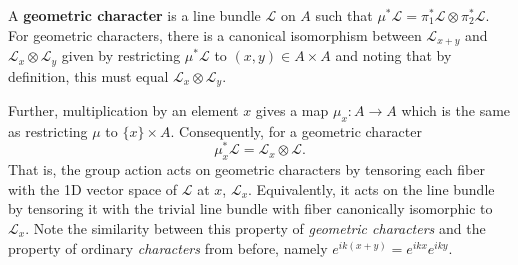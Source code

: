A \textbf{geometric character} is a line bundle $\mathcal L$ on $A$ such that $\mu^* \mathcal L = \pi_1^* \mathcal L \otimes \pi_2^* \mathcal L$.
For geometric characters, there is a canonical isomorphism between $\mathcal L_{x+y}$ and $\mathcal L_x \otimes \mathcal L_y$ given by restricting $\mu^* \mathcal L$ to $(x,y) \in A \times A$ and noting that by definition, this must equal $\mathcal L_x \otimes \mathcal L_y$.

Further, multiplication by an element $x$ gives a map $\mu_x: A \to A$ which is the same as restricting $\mu$ to $\{x\} \times A$. Consequently, for a geometric character
\[
	\mu_x^* \mathcal L = \mathcal L_x \otimes \mathcal L.
\]
That is, the group action acts on geometric characters by tensoring each fiber with the 1D vector space of $\mathcal L$ at $x$, $\mathcal L_x$. Equivalently, it acts on the line bundle by tensoring it with the trivial line bundle with fiber canonically isomorphic to $\mathcal L_x$. Note the similarity between this property of \emph{geometric characters} and the property of ordinary \emph{characters} from before, namely $e^{ik(x+y)} = e^{ikx} e^{iky}$.

